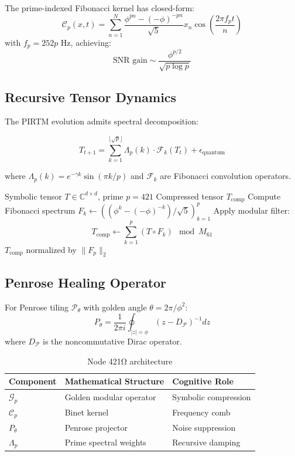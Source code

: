 \documentclass[12pt]{article}
\begin{document}
\begin{theorem}
The prime-indexed Fibonacci kernel has closed-form:
\[
\mathcal{C}_p(x,t) = \sum_{n=1}^N \frac{\phi^{pn}-(-\phi)^{-pn}}{\sqrt{5}} x_n \cos\left(\frac{2\pi f_p t}{n}\right)
\]
with $f_p=252p$ Hz, achieving:
\[
\text{SNR gain} \sim \frac{\phi^{p/2}}{\sqrt{p\log p}}
\]
\end{theorem}

\subsection{Recursive Tensor Dynamics}
The PIRTM evolution admits spectral decomposition:

\begin{equation}
T_{t+1} = \sum_{k=1}^{\lfloor \sqrt{p} \rfloor} \Lambda_p(k) \cdot \mathcal{F}_k(T_t) + \epsilon_{\text{quantum}}
\end{equation}

where $\Lambda_p(k)=e^{-\gamma k}\sin(\pi k/p)$ and $\mathcal{F}_k$ are Fibonacci convolution operators.

\begin{algorithm}[H]
\caption{Golden Quantum Compression}
\begin{algorithmic}[1]
\Require Symbolic tensor $T\in\mathbb{C}^{d\times d}$, prime $p=421$
\Ensure Compressed tensor $T_{\text{comp}}$
\State Compute Fibonacci spectrum $F_k \gets ((\phi^k - (-\phi)^{-k})/\sqrt{5})_{k=1}^p$
\State Apply modular filter:
\[
T_{\text{comp}} \gets \sum_{k=1}^p (T\circ F_k)\mod M_{61}
\]
\State \Return $T_{\text{comp}}$ normalized by $\|F_p\|_2$
\end{algorithmic}
\end{algorithm}

\subsection{Penrose Healing Operator}
\begin{definition}
For Penrose tiling $\mathcal{P}_\theta$ with golden angle $\theta=2\pi/\phi^2$:
\[
P_\theta = \frac{1}{2\pi i}\oint_{|z|=\phi} (z-D_\mathcal{P})^{-1}dz
\]
where $D_\mathcal{P}$ is the noncommutative Dirac operator.
\end{definition}

\begin{table}[h]
\centering
\begin{tabular}{lll}
\toprule
\textbf{Component} & \textbf{Mathematical Structure} & \textbf{Cognitive Role} \\
\midrule
$\mathcal{G}_p$ & Golden modular operator & Symbolic compression \\
$\mathcal{C}_p$ & Binet kernel & Frequency comb \\
$P_\theta$ & Penrose projector & Noise suppression \\
$\Lambda_p$ & Prime spectral weights & Recursive damping \\
\bottomrule
\end{tabular}
\caption{Node 421Ω architecture}
\end{table}
\end{document}

